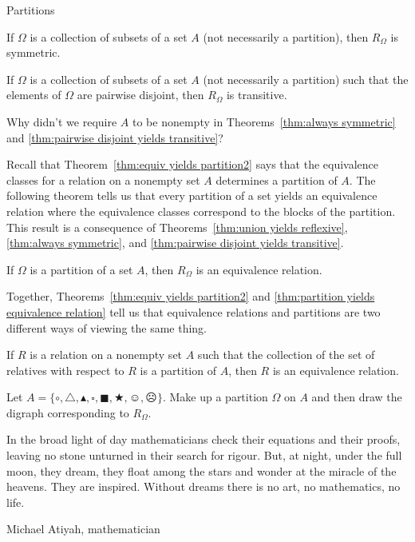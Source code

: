 \begin{section}{Partitions}
\begin{theorem}\label{thm:always symmetric}
If $\Omega$ is a collection of subsets of a set $A$ (not necessarily a partition), then $R_{\Omega}$ is symmetric.
\end{theorem}

\begin{theorem}\label{thm:pairwise disjoint yields transitive}
If $\Omega$ is a collection of subsets of a set $A$ (not necessarily a partition) such that the elements of $\Omega$ are pairwise disjoint, then $R_{\Omega}$ is transitive.
\end{theorem}

\begin{problem}
Why didn't we require $A$ to be nonempty in Theorems~\ref{thm:always symmetric} and \ref{thm:pairwise disjoint yields transitive}?
\end{problem}

Recall that Theorem~\ref{thm:equiv yields partition2} says that the equivalence classes for a relation on a nonempty set $A$ determines a partition of $A$.  The following theorem tells us that every partition of a set yields an equivalence relation where the equivalence classes correspond to the blocks of the partition. This result is a consequence of Theorems~\ref{thm:union yields reflexive}, \ref{thm:always symmetric}, and \ref{thm:pairwise disjoint yields transitive}.

\begin{theorem}\label{thm:partition yields equivalence relation}
If $\Omega$ is a partition of a set $A$, then $R_{\Omega}$ is an equivalence relation.
\end{theorem}

Together, Theorems~\ref{thm:equiv yields partition2} and \ref{thm:partition yields equivalence relation} tell us that equivalence relations and partitions are two different ways of viewing the same thing.

\begin{corollary}\label{cor:partition yields equivalence relation}
If $R$ is a relation on a nonempty set $A$ such that the collection of the set of relatives with respect to $R$ is a partition of $A$, then $R$ is an equivalence relation.
\end{corollary}

\begin{problem}
Let $A=\{\circ, \triangle, \blacktriangle, \square, \blacksquare, \bigstar, \smiley, \frownie\}$.  Make up a partition $\Omega$ on $A$ and then draw the digraph corresponding to $R_{\Omega}$.
\end{problem}

\epigraph{In the broad light of day mathematicians check their equations and their proofs, leaving no stone unturned in their search for rigour. But, at night, under the full moon, they dream, they float among the stars and wonder at the miracle of the heavens. They are inspired. Without dreams there is no art, no mathematics, no life.}{Michael Atiyah, mathematician}

\end{section}